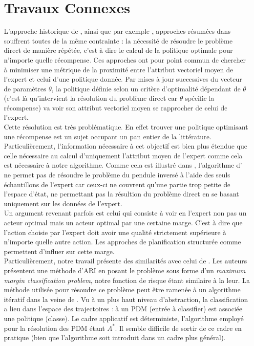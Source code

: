 \documentclass[publibook-draft]{CAp2012}
\begin{document}
\section{Travaux Connexes}
\label{biblio.sec}
L'approche historique de \cite{ng2000algorithms}, ainsi que par exemple \cite{abbeel2004apprenticeship,syed2008apprenticeship,syed2008game, ziebart2008maximum}, approches résumées dans \cite{neu2009training} souffrent toutes de la même contrainte : la nécessité de résoudre le problème direct de manière répétée, c'est à dire le calcul de la politique optimale pour n'importe quelle récompense. Ces approches ont pour point commun de chercher à minimiser une métrique de la proximité entre l'attribut vectoriel moyen de \mbox{l'expert} et celui d'une politique donnée. Par mises à jour successives du vecteur de paramètres $\theta$, la politique définie selon un critère d'optimalité dépendant de $\theta$ (c'est là qu'intervient la résolution du problème direct car $\theta$ spécifie la récompense) va voir son attribut vectoriel moyen se rapprocher de celui de l'expert.\\

Cette résolution est très problématique. En effet trouver une politique optimisant une récompense est un sujet occupant un pan entier de la littérature. Particulièrement, l'information nécessaire à cet objectif est bien plus étendue que celle nécessaire au calcul d'uniquement l'attribut moyen de l'expert comme cela est nécessaire à notre algorithme. Comme cela est illustré dans \cite{klein2011batch}, l'algorithme d'\citet{abbeel2004apprenticeship} ne permet pas de résoudre le problème du pendule inversé à l'aide des seuls échantillons de l'expert car ceux-ci ne couvrent qu'une partie trop petite de l'espace d'état, ne permettant pas la résultion du problème direct en se basant uniquement sur les  données de l'expert.\\

Un argument revenant parfois est celui qui consiste à voir en l'expert non pas un acteur optimal mais un acteur optimal par une certaine marge. C'est à dire que l'action choisie par l'expert doit avoir une qualité strictement supérieure à n'importe quelle autre action. Les approches de planification structurée comme \citet{ratliff2006maximum,ratliff2007imitation, ratliff2007boosting, kolter2008hierarchical} permettent d'influer sur cette marge.\\

Particulièrement, notre travail présente des similarités avec celui de \citet{ratliff2006maximum}. Les auteurs présentent une méthode d'ARI en posant le problème sous forme d'un \emph{maximum margin classification problem}, notre fonction de risque étant similaire à la leur. La méthode utilisée pour résoudre ce problème peut être ramenée à un algorithme itératif dans la veine de \cite{abbeel2004apprenticeship}. Vu à un plus haut niveau d'abstraction, la classification a lieu dans l'espace des trajectoires : à un PDM (entrée à classifier) est associée une politique (classe). Le cadre applicatif est déterministe, l'algorithme employé pour la résolution des PDM étant $A^*$. Il semble difficile de sortir de ce cadre  en pratique (bien que l'algorithme soit introduit dans un cadre plus général).
\end{document}
